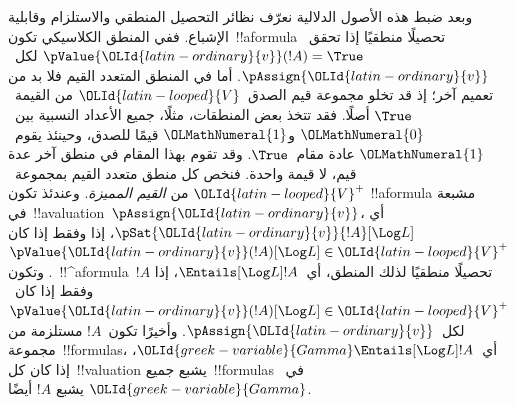 \documentclass[../../../include/open-logic-section]{subfiles}
\begin{document}
وبعد ضبط هذه الأصول الدلالية نعرّف نظائر التحصيل المنطقي والاستلزام
وقابلية الإشباع. ففي المنطق الكلاسيكي تكون~!!a{formula} تحصيلًا
منطقيًا إذا تحقق~$\pValue{{\OLId{latin-ordinary}{v}}}(!A) = \True$ لكل~$\pAssign{{\OLId{latin-ordinary}{v}}}$.
أما في المنطق المتعدد القيم فلا بد من تعميم آخر؛ إذ قد تخلو مجموعة
قيم الصدق~${\OLId{latin-looped}{V}}$ من القيمة~$\True$ أصلًا. فقد تتخذ بعض المنطقات، مثلًا، جميع الأعداد
النسبية بين~${\OLMathNumeral{0}}$ و${\OLMathNumeral{1}}$ قيمًا للصدق، وحينئذ يقوم~${\OLMathNumeral{1}}$ عادة مقام~$\True$.
وقد تقوم بهذا المقام في منطق آخر عدة قيم، لا قيمة واحدة. فنخص كل
منطق متعدد القيم بمجموعة~${\OLId{latin-looped}{V}}^+$ من \emph{القيم المميزة}. وعندئذ تكون
!!a{formula} مشبعة في~!!a{valuation}~$\pAssign{{\OLId{latin-ordinary}{v}}}$، أي
$\pSat{{\OLId{latin-ordinary}{v}}}{!A}[\Log L]$، إذا وفقط إذا كان
$\pValue{{\OLId{latin-ordinary}{v}}}(!A)[\Log L] \in {\OLId{latin-looped}{V}}^+$. وتكون~!!^a{formula}~$!A$
تحصيلًا منطقيًا لذلك المنطق، أي~$\Entails[\Log L] !A$، إذا وفقط إذا
كان~$\pValue{{\OLId{latin-ordinary}{v}}}(!A)[\Log L] \in {\OLId{latin-looped}{V}}^+$ لكل~$\pAssign{{\OLId{latin-ordinary}{v}}}$. وأخيرًا تكون~$!A$
مستلزمة من مجموعة~!!{formula}s، أي~${\OLId{greek-variable}{Gamma}} \Entails[\Log L] !A$،
إذا كان كل~!!{valuation} يشبع جميع~!!{formula}s في~${\OLId{greek-variable}{Gamma}}$ يشبع
$!A$ أيضًا.
\end{document}
